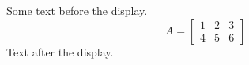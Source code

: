 \documentclass[12pt]{article}
\begin{document}
Some text before the display.
\[ A = \begin{bmatrix} 1 & 2 & 3 \\ 4 & 5 & 6 \end{bmatrix} \]
Text after the display.
\end{document}
